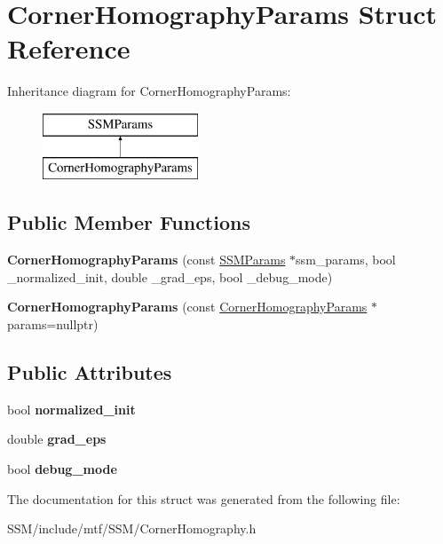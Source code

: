 \hypertarget{structCornerHomographyParams}{\section{Corner\-Homography\-Params Struct Reference}
\label{structCornerHomographyParams}
}
Inheritance diagram for Corner\-Homography\-Params\-:\begin{figure}[H]
\begin{center}
\leavevmode
\includegraphics[height=2.000000cm]{structCornerHomographyParams}
\end{center}
\end{figure}
\subsection*{Public Member Functions}
\begin{DoxyCompactItemize}
\item 
\hypertarget{structCornerHomographyParams_ae7ee6a4557732ec5632a33fe95b6585a}{{\bfseries Corner\-Homography\-Params} (const \hyperlink{structSSMParams}{S\-S\-M\-Params} $\ast$ssm\-\_\-params, bool \-\_\-normalized\-\_\-init, double \-\_\-grad\-\_\-eps, bool \-\_\-debug\-\_\-mode)}\label{structCornerHomographyParams_ae7ee6a4557732ec5632a33fe95b6585a}

\item 
\hypertarget{structCornerHomographyParams_aa244ce18dd02613a5563d43c0e51c6d3}{{\bfseries Corner\-Homography\-Params} (const \hyperlink{structCornerHomographyParams}{Corner\-Homography\-Params} $\ast$params=nullptr)}\label{structCornerHomographyParams_aa244ce18dd02613a5563d43c0e51c6d3}

\end{DoxyCompactItemize}
\subsection*{Public Attributes}
\begin{DoxyCompactItemize}
\item 
\hypertarget{structCornerHomographyParams_a0fbf649bfcfd56cd2386a5aa9c38bc44}{bool {\bfseries normalized\-\_\-init}}\label{structCornerHomographyParams_a0fbf649bfcfd56cd2386a5aa9c38bc44}

\item 
\hypertarget{structCornerHomographyParams_ae3ddf69f1ef096caff84aa98ca55427f}{double {\bfseries grad\-\_\-eps}}\label{structCornerHomographyParams_ae3ddf69f1ef096caff84aa98ca55427f}

\item 
\hypertarget{structCornerHomographyParams_a8712cad8cb2b27ee3023d86627aaaefa}{bool {\bfseries debug\-\_\-mode}}\label{structCornerHomographyParams_a8712cad8cb2b27ee3023d86627aaaefa}

\end{DoxyCompactItemize}


The documentation for this struct was generated from the following file\-:\begin{DoxyCompactItemize}
\item 
S\-S\-M/include/mtf/\-S\-S\-M/Corner\-Homography.\-h\end{DoxyCompactItemize}
